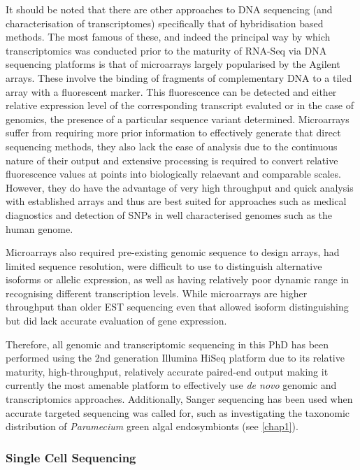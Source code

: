 It should be noted that there are other approaches to DNA sequencing (and characterisation of 
transcriptomes) specifically that of hybridisation based methods.  The most famous of these,
and indeed the principal way by which transcriptomics was conducted prior to the maturity of
RNA-Seq via DNA sequencing platforms is that of microarrays largely popularised by the Agilent
arrays.  These involve the binding of
fragments of complementary DNA to a tiled array with a fluorescent marker.  This fluorescence
can be detected and either relative expression level of the corresponding transcript evaluted
or in the case of genomics, the presence of a particular sequence variant determined.  
Microarrays suffer from requiring more prior information to effectively generate that direct
sequencing methods, they also lack the ease of analysis due to the continuous nature of their output
and extensive processing is required to convert relative fluorescence values at points into biologically
relaevant and comparable scales.  However, they do have the advantage of very high throughput and quick
analysis with established arrays and thus are best suited for approaches such as medical diagnostics
and detection of SNPs in well characterised genomes such as the human genome.

Microarrays also required pre-existing genomic sequence to design arrays, had limited sequence resolution,
were difficult to use to distinguish alternative isoforms or allelic expression, as well as having relatively
poor dynamic range in recognising different transcription levels.  While microarrays are higher throughput
than older EST sequencing even that allowed isoform distinguishing but did lack accurate evaluation of 
gene expression. \citep{Wang2009}




Therefore, all genomic and transcriptomic sequencing in this PhD has been performed using the 2nd generation
Illumina HiSeq platform due to its relative maturity, high-throughput, relatively accurate
paired-end output making it currently the most amenable platform to effectively
use \textit{de novo} genomic and transcriptomics approaches.  Additionally, Sanger sequencing
has been used when accurate targeted sequencing was called for, such as investigating the
taxonomic distribution of \textit{Paramecium} green algal endosymbionts (see \ref{chap1}).



\subsubsection{Single Cell Sequencing}


